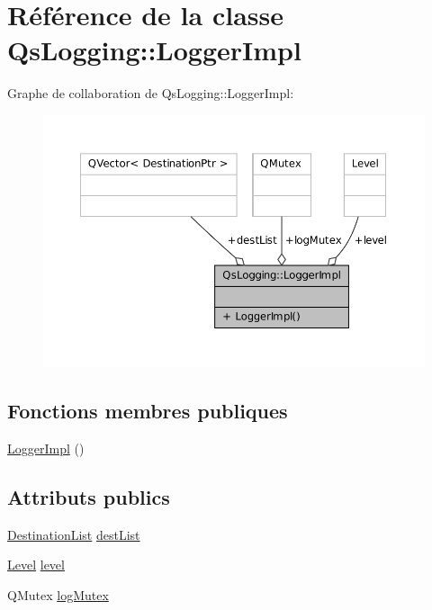 \hypertarget{classQsLogging_1_1LoggerImpl}{\section{Référence de la classe Qs\-Logging\-:\-:Logger\-Impl}
\label{classQsLogging_1_1LoggerImpl}
}


Graphe de collaboration de Qs\-Logging\-:\-:Logger\-Impl\-:
\nopagebreak
\begin{figure}[H]
\begin{center}
\leavevmode
\includegraphics[width=350pt]{classQsLogging_1_1LoggerImpl__coll__graph}
\end{center}
\end{figure}
\subsection*{Fonctions membres publiques}
\begin{DoxyCompactItemize}
\item 
\hyperlink{classQsLogging_1_1LoggerImpl_a97418676fcfcb2fb13c0ebbbae3ef184}{Logger\-Impl} ()
\end{DoxyCompactItemize}
\subsection*{Attributs publics}
\begin{DoxyCompactItemize}
\item 
\hyperlink{namespaceQsLogging_a566a41f076f9a05c94cb6980ec554e2c}{Destination\-List} \hyperlink{classQsLogging_1_1LoggerImpl_acdbde93fec67bd0bcce8da1fc1080ece}{dest\-List}
\item 
\hyperlink{namespaceQsLogging_a38c7dd87e4de6f8eb460763ad0baa033}{Level} \hyperlink{classQsLogging_1_1LoggerImpl_a4d3c9f4b81baa52df759b6d07bda0a69}{level}
\item 
Q\-Mutex \hyperlink{classQsLogging_1_1LoggerImpl_a8feaba4a7a7160106987943313804c35}{log\-Mutex}
\end{DoxyCompactItemize}


